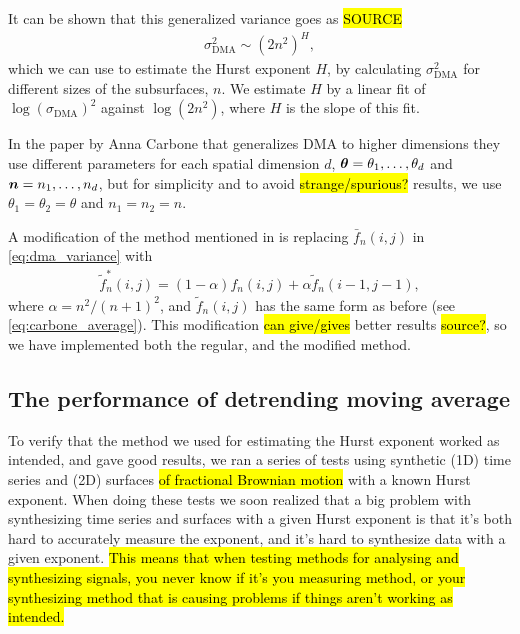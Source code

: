 It can be shown that this generalized variance goes as \hl{SOURCE}
\begin{align*}
    \sigma_\text{DMA}^2 \sim \left(2n^2\right)^H,
\end{align*}
which we can use to estimate the Hurst exponent $H$, by calculating $\sigma_\text{DMA}^2$ for different sizes of the subsurfaces, $n$. We estimate $H$ by a linear fit of $\log \left(\sigma_\text{DMA}\right)^2$ against $\log \left(2n^2 \right)$, where $H$ is the slope of this fit.

In the paper by Anna Carbone that generalizes DMA to higher dimensions\cite{carbone2007algorithm} they use different parameters for each spatial dimension $d$, $\boldsymbol{\theta} = \theta_1, \dots, \theta_d$ and $\boldsymbol{n} = n_1, \dots, n_d$, but for simplicity and to avoid \hl{strange/spurious?} results, we use $\theta_1 = \theta_2 = \theta$ and $n_1 = n_2 = n$.

A modification of the method mentioned in \cite{carbone2007algorithm} is replacing $\bar f_n(i,j)$ in \cref{eq:dma_variance} with
\begin{align*}
    \tilde f_n^*(i,j) = (1-\alpha) f_n(i,j) + \alpha \tilde f_n(i-1,j-1),
\end{align*}
where $\alpha = n^2/(n+1)^2$, and $\tilde f_n(i,j)$ has the same form as before (see \cref{eq:carbone_average}). This modification \hl{can give/gives} better results \hl{source?}, so we have  implemented both the regular, and the modified method.


\subsection{The performance of detrending moving average}
To verify that the method we used for estimating the Hurst exponent worked as intended, and gave good results, we ran a series of tests using synthetic (1D) time series and (2D) surfaces \hl{of fractional Brownian motion} with a known Hurst exponent. When doing these tests we soon realized that a big problem with synthesizing time series and surfaces with a given Hurst exponent is that it's both hard to accurately measure the exponent, and it's hard to synthesize data with a given exponent. \hl{This means that when testing methods for analysing and synthesizing signals, you never know if it's you measuring method, or your synthesizing method that is causing problems if things aren't working as intended.}

